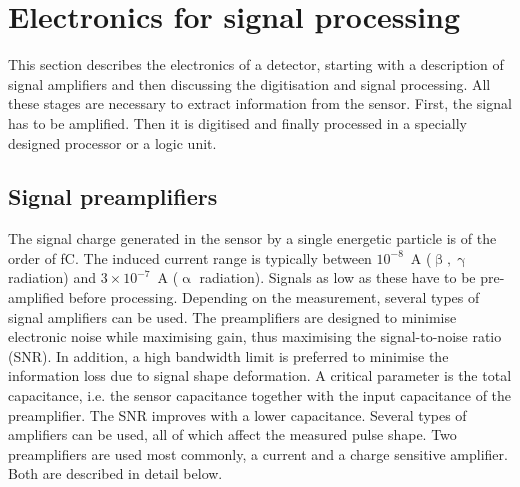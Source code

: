 \section{Electronics for signal processing} %
\label{sec:elecsigproc}
This section describes the electronics of a detector, starting with a description of signal amplifiers and then discussing the digitisation and signal processing. All these stages are necessary to extract information from the sensor. First, the signal has to be amplified. Then it is digitised and finally processed in a specially designed processor or a logic unit.

\subsection{Signal preamplifiers}
The signal charge generated in the sensor by a single energetic particle is of the order of fC. The induced current range is typically between $10^{-8}$~A ($\upbeta, \upgamma$ radiation) and $3\times10^{-7}$~A ($\upalpha$ radiation). Signals as low as these have to be pre-amplified before processing. Depending on the measurement, several types of signal amplifiers can be used. The preamplifiers are designed to minimise electronic noise while maximising gain, thus maximising the signal-to-noise ratio (SNR). In addition, a high bandwidth limit is preferred to minimise the information loss due to signal shape deformation. A critical parameter is the total capacitance, i.e. the sensor capacitance together with the input capacitance of the preamplifier. The SNR improves with a lower capacitance. Several types of amplifiers can be used, all of which affect the measured pulse shape. Two preamplifiers are used most commonly, a current and a charge sensitive amplifier. Both are described in detail below. 

